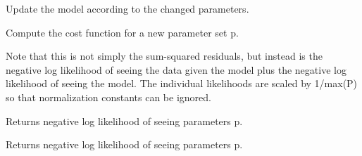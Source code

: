 \documentclass[letterpaper,10pt,english]{sphinxmanual}
\begin{document}
\begin{fulllineitems}
\begin{fulllineitems}
\label{api/fitproblem:refl1d.fitproblem.FitProblem.model_update}
Update the model according to the changed parameters.

\end{fulllineitems}


\begin{fulllineitems}
\label{api/fitproblem:refl1d.fitproblem.FitProblem.nllf}
Compute the cost function for a new parameter set p.

Note that this is not simply the sum-squared residuals, but instead
is the negative log likelihood of seeing the data given the model plus
the negative log likelihood of seeing the model.  The individual
likelihoods are scaled by 1/max(P) so that normalization constants
can be ignored.

\end{fulllineitems}


\begin{fulllineitems}
\label{api/fitproblem:refl1d.fitproblem.FitProblem.parameter_nllf}
Returns negative log likelihood of seeing parameters p.

\end{fulllineitems}


\begin{fulllineitems}
\label{api/fitproblem:refl1d.fitproblem.FitProblem.parameter_residuals}
Returns negative log likelihood of seeing parameters p.

\end{fulllineitems}


\begin{fulllineitems}
\label{api/fitproblem:refl1d.fitproblem.FitProblem.plot}
\end{fulllineitems}


\end{fulllineitems}
\end{document}
